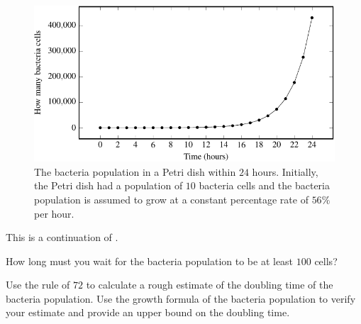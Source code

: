 \documentclass[a4paper,oneside,12pt]{article}
\begin{document}
\begin{figure}[!htbp]
\centering
\includegraphics[scale=1.1]{image/11/bacteria.pdf}
\caption{%
  The bacteria population in a Petri dish within $24$ hours.
  Initially, the Petri dish had a population of $10$ bacteria cells
  and the bacteria population is assumed to grow at a constant
  percentage rate of $56\%$ per hour.
}
\label{fig:bacteria_population_24_hours}
\end{figure}

\begin{exercise}
This is a continuation of .
\begin{packedenum}
\item\label{subex:bacteria_100_cells}
  How long must you wait for the bacteria population to be at least
  $100$ cells?

\item\label{subex:bacteria_doubling_time}
  Use the rule of $72$ to calculate a rough estimate of the doubling
  time of the bacteria population.  Use the growth formula of the
  bacteria population to verify your estimate and provide an upper
  bound on the doubling time.
\end{packedenum}
\end{exercise}
\end{document}
